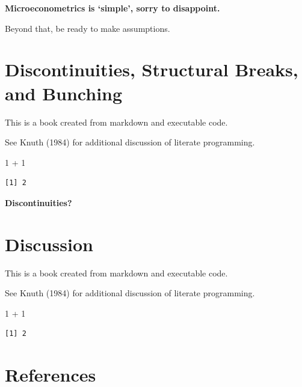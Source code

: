 \documentclass[
  letterpaper,
  DIV=11,
  numbers=noendperiod]{scrreprt}
\newenvironment{Shaded}{\begin{snugshade}}{\end{snugshade}}
\newcommand{\DecValTok}[1]{\textcolor[rgb]{0.68,0.00,0.00}{#1}}
\newcommand{\SpecialCharTok}[1]{\textcolor[rgb]{0.37,0.37,0.37}{#1}}
\theoremstyle{definition}
\theoremstyle{remark}
\begin{document}
\textbf{Microeconometrics is `simple', sorry to disappoint.}

Beyond that, be ready to make assumptions.

\chapter{Discontinuities, Structural Breaks, and
Bunching}\label{discontinuities-structural-breaks-and-bunching}

This is a book created from markdown and executable code.

See Knuth (1984) for additional discussion of literate programming.

\begin{Shaded}
\begin{Highlighting}[]
\DecValTok{1} \SpecialCharTok{+} \DecValTok{1}
\end{Highlighting}
\end{Shaded}

\begin{verbatim}
[1] 2
\end{verbatim}

\textbf{Discontinuities?}


\chapter{Discussion}\label{discussion}

This is a book created from markdown and executable code.

See Knuth (1984) for additional discussion of literate programming.

\begin{Shaded}
\begin{Highlighting}[]
\DecValTok{1} \SpecialCharTok{+} \DecValTok{1}
\end{Highlighting}
\end{Shaded}

\begin{verbatim}
[1] 2
\end{verbatim}

\cleardoublepage
{}
{}
\appendix

\chapter*{References}\label{references}
\end{document}
